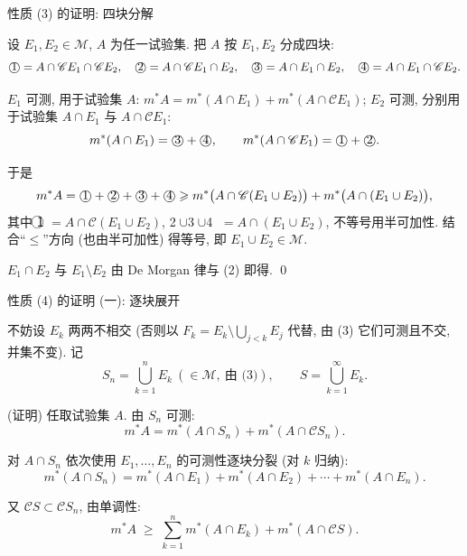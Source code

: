 
\begin{frame}{性质 (3) 的证明: 四块分解}

设 $E_1, E_2 \in \mathscr{M}$, $A$ 为任一试验集. 把 $A$ 按 $E_1, E_2$ 分成四块:
\[
\text{\textcircled{1}} = A \cap \mathscr{C}E_1 \cap \mathscr{C}E_2, \quad
\text{\textcircled{2}} = A \cap \mathscr{C}E_1 \cap E_2, \quad
\text{\textcircled{3}} = A \cap E_1 \cap E_2, \quad
\text{\textcircled{4}} = A \cap E_1 \cap \mathscr{C}E_2 .
\]

\pause

$E_1$ 可测, 用于试验集 $A$: $m^* A = m^* (A \cap E_1) + m^* (A \cap \mathscr{C}E_1)$;
$E_2$ 可测, 分别用于试验集 $A \cap E_1$ 与 $A \cap \mathscr{C}E_1$:
\[
m^* (A \cap E_1) = \text{\textcircled{3}} + \text{\textcircled{4}}, \qquad
m^* (A \cap \mathscr{C}E_1) = \text{\textcircled{1}} + \text{\textcircled{2}} .
\]

\pause

于是
\[
m^* A = \text{\textcircled{1}} + \text{\textcircled{2}} + \text{\textcircled{3}} + \text{\textcircled{4}}
\geqslant m^*\big(A \cap \mathscr{C}(E_1 \cup E_2)\big) + m^*\big(A \cap (E_1 \cup E_2)\big),
\]
其中 \textcircled{1} $= A \cap \mathscr{C}(E_1 \cup E_2)$, \textcircled{2}$\cup$\textcircled{3}$\cup$\textcircled{4} $= A \cap (E_1 \cup E_2)$, 不等号用半可加性. 结合``$\leqslant$''方向 (也由半可加性) 得等号, 即 $E_1 \cup E_2 \in \mathscr{M}$.

$E_1 \cap E_2$ 与 $E_1 \setminus E_2$ 由 De Morgan 律与 (2) 即得.
\qed

\end{frame}


\begin{frame}{性质 (4) 的证明 (一): 逐块展开}

不妨设 $E_k$ 两两不相交 (否则以 $F_k = E_k \setminus \bigcup_{j < k} E_j$ 代替, 由 (3) 它们可测且不交, 并集不变). 记
\[
S_n = \bigcup_{k=1}^n E_k \ (\in \mathscr{M},\ \text{由 (3)}), \qquad S = \bigcup_{k=1}^\infty E_k .
\]

\startproof[bg=yellow, fg=red](证明)
任取试验集 $A$. 由 $S_n$ 可测:
\[
m^* A = m^* (A \cap S_n) + m^* (A \cap \mathscr{C} S_n).
\]

\pause

对 $A \cap S_n$ 依次使用 $E_1, \ldots, E_n$ 的可测性逐块分裂 (对 $k$ 归纳):
\[
m^* (A \cap S_n) = m^*(A \cap E_1) + m^* (A \cap E_2) + \cdots + m^*(A \cap E_n).
\]

\pause

又 $\mathscr{C}S \subset \mathscr{C}S_n$, 由单调性:
\[
m^* A \;\geqslant\; \sum_{k=1}^n m^* (A \cap E_k) + m^* (A \cap \mathscr{C} S).
\]

\end{frame}

